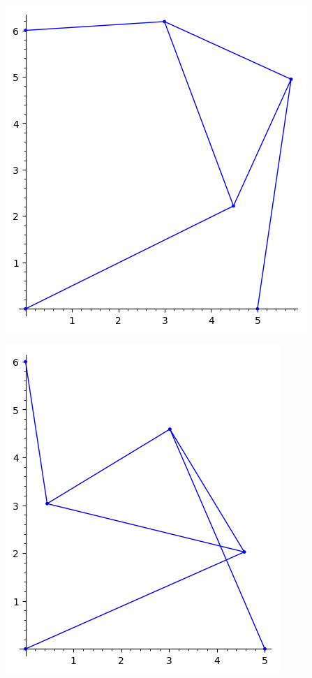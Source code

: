 \documentclass{article}
\begin{document}
\begin{multicols}{2}
\begin{center}
\includegraphics[scale=0.4]{lidur4b3plot}
\end{center}
\columnbreak
\begin{center}
\includegraphics[scale=0.4]{lidur4b4plot}
\end{center}
\end{multicols}
\end{document}
